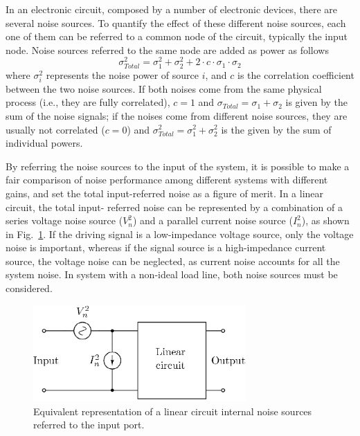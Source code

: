 In an electronic circuit, composed by a number of electronic devices, there are several noise sources. To quantify the effect of these different noise sources, each one of them can be referred to a common node of the circuit, typically the input node. Noise sources referred to the same node are added as power as follows 
\begin{equation}
\sigma^2_\textit{Total} = \sigma^2_1 + \sigma^2_2 + 2\cdot c \cdot \sigma_1 \cdot \sigma_2
\end{equation}
where $\sigma_i^2$ represents the noise power of source $i$, and $c$ is the correlation coefficient between the two noise sources. If both noises come from the same physical process (i.e., they are fully correlated), $c = 1$ and $\sigma_\textit{Total} = \sigma_1 + \sigma_2$ is given by the sum of the noise signals; if the noises come from different noise sources, they are usually not correlated ($c = 0$) and $\sigma^2_\textit{Total} = \sigma^2_1 + \sigma^2_2$ is the given by the sum of individual powers.

By referring the noise sources to the input of the system, it is possible to make a fair comparison of noise performance among different systems with different gains, and set the total input-referred noise as a figure of merit. In a linear circuit, the total input- referred noise can be represented by a combination of a series voltage noise source ($V_n^2$) and a parallel current noise source ($I_n^2$), as shown in Fig.~\ref{fig:noise_cir}. If the driving signal is a low-impedance voltage source, only the voltage noise is important, whereas if the signal source is a high-impedance current source, the voltage noise can be neglected, as current noise accounts for all the system noise. In system with a non-ideal load line, both noise sources must be considered.

\begin{figure}[!t]
	\centering
	\includegraphics[width=3.2in]{./Figures/noise_cir}
	\caption{Equivalent representation of a linear circuit internal noise sources referred to the input port.}\label{fig:noise_cir}
\end{figure}

